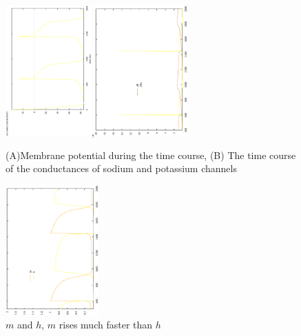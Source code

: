 \begin{figure}[hbt]
  \centerline{\includegraphics[height=5cm, angle=-90]{./images/Noble_model_V_t.eps},\includegraphics[height=5cm, angle=-90]{./images/Noble_model_gK_gNa.eps}}
  \caption{(A)Membrane potential during the time course, (B) The time
    course of the conductances of sodium and potassium channels}
  \label{fig:Noble}
\end{figure}


\begin{figure}[hbt]
  \centerline{\includegraphics[height=5cm, angle=-90]{./images/Noble_model_m_h.eps}}
  \caption{$m$ and $h$, $m$ rises much faster than $h$}
  \label{fig:Noble_m_h}
\end{figure}


